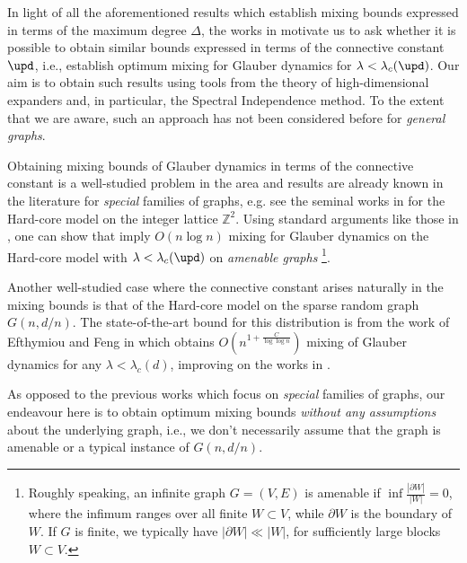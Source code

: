 \documentclass[11pt,reqno]{amsart}
\numberwithin{equation}{section}
\newcommand{\blue}[1]{{\color{blue}#1}}
\newcommand{\goldenbrown}[1]{{\color{goldenbrown}#1}}
\newcommand{\maxDeg}{{\Delta}}
\newcommand{\cconnective}{\goldenbrown{\upd}}
\newcommand{\lcritical}{{\lambda_c}}
\newcommand{\abs}[1]{\blue{|}#1\blue{|}}
\renewcommand{\blue}[1]{#1}
\renewcommand{\goldenbrown}[1]{#1}
\begin{document}
In light of all the aforementioned  results which establish mixing bounds  expressed in terms of the maximum 
degree $\maxDeg$, the  works in \cite{ConnectiveConstFirst,ConnectiveConst}  motivate us to ask  whether 
it is possible to obtain  similar bounds expressed in terms of the connective 
constant $\cconnective$, i.e., establish optimum mixing for Glauber dynamics  for $\lambda<\lcritical(\cconnective)$. 
Our aim is to obtain such results using  tools from the theory of high-dimensional expanders and, in particular, the 
Spectral Independence method. 
%
To the extent that we are aware, such an approach has not been considered before for {\em general graphs}.







Obtaining   mixing bounds of Glauber dynamics in terms of  the connective constant is a well-studied problem in the area
and  results  are already known in the  literature for  {\em special}  families of graphs, e.g. see the seminal works in 
\cite{HCZ2PaperA,HCZ2PaperB} for the Hard-core model on the integer lattice $\mathbb{Z}^2$.
%
Using standard arguments like those in   \cite{CesiAmenable,MixingTimeSpaceRSA}, one can show that 
\cite{ConnectiveConstFirst,ConnectiveConst} imply $O(n\log n)$ mixing for Glauber dynamics  on 
the Hard-core model with  $\lambda<\lcritical(\cconnective)$ on  {\em amenable graphs}
\footnote{Roughly speaking,  an infinite graph $G=(V,E)$ is amenable if $\inf\frac{\abs{ \partial W}}{\abs{W}}=0$, 
where the infimum ranges over  all finite $W\subset  V$, while $\partial W$ is the boundary of $W$. If $G$ is finite, 
we typically have $\abs{ \partial W}\ll \abs{W}$, for sufficiently large blocks $W\subset V$.}.






Another well-studied case where the connective constant arises naturally in the mixing bounds is that
of the Hard-core model  on  the sparse random  graph $G(n,d/n)$. The state-of-the-art  bound for 
this distribution  is from  the work of Efthymiou and Feng in  \cite{EfthFeng23} which obtains $O(n^{1+\frac{C}{\log\log n}})$ 
mixing of Glauber dynamics for any $\lambda<\lcritical(d)$, improving on the works in \cite{SIGnp,Efth19}.  
%





As opposed to the previous works  which focus on {\em special} families of graphs, our endeavour  here is to obtain 
optimum mixing bounds    {\em without any assumptions} about the underlying graph, i.e., we don't necessarily assume that
the  graph is amenable or a typical instance of $G(n,d/n)$. 
%
 
\end{document}
